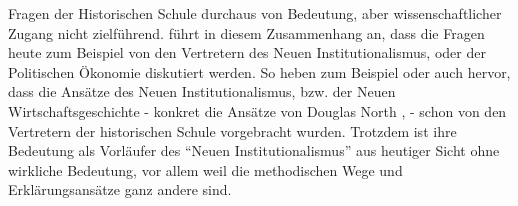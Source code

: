 Fragen der Historischen Schule durchaus von Bedeutung, aber wissenschaftlicher Zugang nicht zielführend. \textcite[S. 210]{Rosner2012} führt in diesem Zusammenhang an, dass die Fragen heute zum Beispiel von den Vertretern des Neuen Institutionalismus, oder der Politischen Ökonomie diskutiert werden. So heben zum Beispiel \textcite{Wischermann1993} oder auch \textcite{Plumpe1999} hervor, dass die Ansätze des Neuen Institutionalismus, bzw. der Neuen Wirtschaftsgeschichte - konkret die Ansätze von Douglas North \parencite[S. 243]{Wischermann1993}, \parencite[S. 257]{Plumpe1999} - schon von den Vertretern der historischen Schule vorgebracht wurden. Trotzdem ist ihre Bedeutung als Vorläufer des "`Neuen Institutionalismus"' aus heutiger Sicht ohne wirkliche Bedeutung, vor allem weil die methodischen Wege und Erklärungsansätze ganz andere sind.


